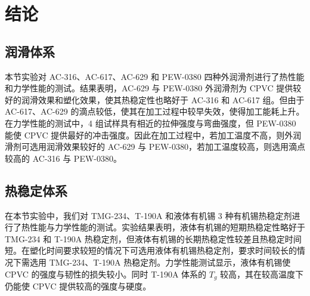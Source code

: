\chapter{结论}

\section{润滑体系}
本节实验对 AC-316、AC-617、AC-629 和 PEW-0380 四种外润滑剂进行了热性能和力学性能的测试。结果表明，AC-629 与 PEW-0380 外润滑剂为 CPVC 提供较好的润滑效果和塑化效果，使其热稳定性也略好于 AC-316 和 AC-617 组。但由于 AC-617、AC-629 的滴点较低，使其在加工过程中较早失效，使得加工能耗上升。在力学性能的测试中，4 组试样具有相近的拉伸强度与弯曲强度，但 PEW-0380 能使 CPVC 提供最好的冲击强度。因此在加工过程中，若加工温度不高，则外润滑剂可选用润滑效果较好的 AC-629 与 PEW-0380，若加工温度较高，则选用滴点较高的 AC-316 与 PEW-0380。

\section{热稳定体系}
在本节实验中，我们对 TMG-234、T-190A 和液体有机锡 3 种有机锡热稳定剂进行了热性能与力学性能的测试。实验结果表明，液体有机锡的短期热稳定性略好于 TMG-234 和 T-190A 热稳定剂，但液体有机锡的长期热稳定性较差且热稳定时间短。在塑化时间要求较短的情况下可选用液体有机锡热稳定剂，要求时间较长的情况下需选用 TMG-234、T-190A 热稳定剂。力学性能测试显示，液体有机锡使 CPVC 的强度与韧性的损失较小。同时 T-190A 体系的 $T_g$ 较高，其在较高温度下仍能使 CPVC 提供较高的强度与硬度。